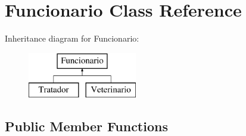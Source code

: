 \hypertarget{classFuncionario}{}\section{Funcionario Class Reference}
\label{classFuncionario}
Inheritance diagram for Funcionario\+:\begin{figure}[H]
\begin{center}
\leavevmode
\includegraphics[height=2.000000cm]{classFuncionario}
\end{center}
\end{figure}
\subsection*{Public Member Functions}
